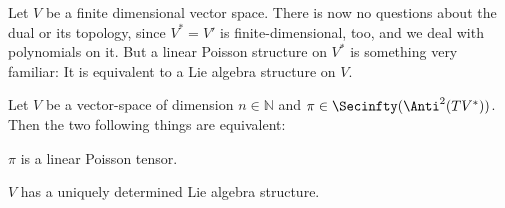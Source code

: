 Let $V$ be a finite dimensional vector space. There is now no questions 
about the dual or its topology, since $V^* = V'$ is finite-dimensional, too, 
and we deal with polynomials on it. But a linear Poisson structure on $V^*$ is 
something very familiar: It is equivalent to a Lie algebra structure on $V$.
\begin{proposition}
	\label{Alg:Prop:LinPoissonIsLieAlg}
	Let $V$ be a vector-space of dimension $n \in \mathbb{N}$ and $\pi \in 
	\Secinfty(\Anti^2(TV^*))$. Then the two following things are 
	equivalent:
	\begin{propositionlist}
		\item
		$\pi$ is a linear Poisson tensor.
		
		\item
		$V$ has a uniquely determined Lie algebra structure.
	\end{propositionlist}
\end{proposition}
